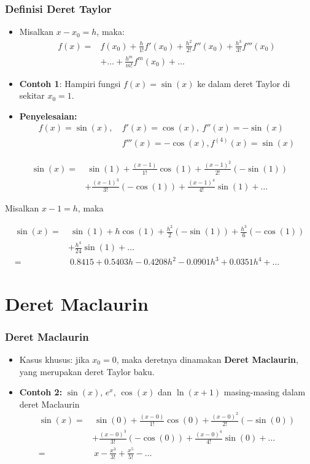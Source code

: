 \documentclass[pdflatex,compress]{beamer}
\begin{document}
\begin{frame}
	\frametitle{Definisi Deret Taylor}
	\begin{itemize}
		\item Misalkan $ x - x_0 = h $, maka:
		\begin{align*}
			f(x) =& f(x_0) + \frac{h}{1!}f'(x_0) + \frac{h^2}{2!}f''(x_0) + \frac{h^3}{3!}f'''(x_0) \\
			&+ \dots + \frac{h^m}{m!}f^m(x_0) + \dots
		\end{align*}
		\item \textbf{Contoh 1}: Hampiri fungsi $ f(x) = \sin(x) $ ke dalam deret Taylor di sekitar $ x_0 = 1 $.
		\item \textbf{Penyelesaian:}
			\begin{align*}
				f(x) = \sin(x),~ &f'(x) = \cos(x),~f''(x) = -\sin(x) \\
				&f'''(x) = -\cos(x), f^{(4)}(x) = \sin(x)
			\end{align*}
	\end{itemize}
\end{frame}

\begin{frame}
	\begin{align*}
		\sin(x) =&~ \sin(1) + \frac{(x-1)}{1!}\cos(1) + \frac{(x-1)^2}{2!}(-\sin(1)) \\
		& + \frac{(x-1)^3}{3!}(-\cos(1)) + \frac{(x-1)^4}{4!}\sin(1) + \dots
	\end{align*}

	Misalkan $ x - 1 = h $, maka
	
	\begin{align*}
		\sin(x) =&~ \sin(1) + h\cos(1) + \frac{h^2}{2}(-\sin(1)) + \frac{h^3}{6}(-\cos(1)) \\
		&+ \frac{h^4}{24}\sin(1) + \dots \\
		=&~ 0.8415 + 0.5403h - 0.4208h^2 - 0.0901h^3 + 0.0351h^4 + \dots
	\end{align*}
\end{frame}

\section{Deret Maclaurin}

\begin{frame}
	\frametitle{Deret Maclaurin}
	\begin{itemize}
		\item Kasus khusus: jika $ x_0 = 0$, maka deretnya dinamakan \textbf{Deret Maclaurin}, yang merupakan deret Taylor baku.
		\item \textbf{Contoh 2:} $ \sin(x) $, $ e^x $, $ \cos(x) $ dan $ \ln(x+1) $ masing-masing dalam deret Maclaurin
		\begin{align*}
			\sin(x) =&~ \sin(0) + \frac{(x-0)}{1!}\cos(0) + \frac{(x-0)^2}{2!}(-\sin(0)) \\
			& + \frac{(x-0)^3}{3!}(-\cos(0)) + \frac{(x-0)^4}{4!}\sin(0) + \dots \\
			=&~ x - \frac{x^3}{3!} + \frac{x^5}{5!} - \dots
		\end{align*}
	\end{itemize}
\end{frame}
\end{document}
